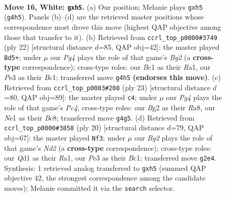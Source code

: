 \documentclass[11pt]{article}
\begin{document}
\clearpage

\begin{figure}[p]\centering
\begin{subfigure}{0.46\textwidth}\centering
\resizebox{\linewidth}{!}{%
\newchessgame
\chessboard[
  setfen={nrb2rk1/pp2npbp/3q4/2p1p2p/6P1/3PP3/PP3PBK/RNBQNR2 w - - 0 16},
  showmover=false,
  pgfstyle=straightmove, color=movearrow, markmove={g4-h5}
]}
\caption{}
\end{subfigure}\hfill
\begin{subfigure}{0.46\textwidth}\centering
\resizebox{\linewidth}{!}{%
\newchessgame
\chessboard[
  setfen={r1b1qrk1/ppp3pp/2np4/5p1n/2PP4/2PQ3N/P3PPB1/R1B1K2R w KQ - 0 12},
  showmover=false,
  pgfstyle=straightmove, color=movearrow, markmove={g2-d5}
]}
\caption{}
\end{subfigure}
\\[4pt]
\begin{subfigure}{0.46\textwidth}\centering
\resizebox{\linewidth}{!}{%
\newchessgame
\chessboard[
  setfen={r1b1k2r/ppqn1pp1/3bp2p/2p5/P2PQ3/3B1N2/1PP2PPP/R1B2RK1 b kq - 1 12},
  showmover=false,
  pgfstyle=straightmove, color=movearrow, markmove={c5-c4}
]}
\caption{}
\end{subfigure}\hfill
\begin{subfigure}{0.46\textwidth}\centering
\resizebox{\linewidth}{!}{%
\newchessgame
\chessboard[
  setfen={r1bqk2r/2ppnppp/2p5/p3b3/1P2P3/2PB4/P1QN1PPP/R1B1K2R w KQkq - 0 11},
  showmover=false,
  pgfstyle=straightmove, color=movearrow, markmove={d2-f3}
]}
\caption{}
\end{subfigure}
\caption{\textbf{Move 16, White: \texttt{gxh5}.} (a) Our position; Melanie plays \texttt{gxh5} (\texttt{g4h5}). Panels (b)--(d) are the retrieved master positions whose correspondence most drove this move (highest QAP objective among those that transfer to it). (b) Retrieved from \texttt{ccrl\_top\_p0000\#3749} (ply 22) [structural distance $d$=85, QAP obj=42]: the master played \texttt{Bd5+}; under $\mu$ our \emph{Pg4} plays the role of that game's \emph{Bg2} (a \textbf{cross-type} correspondence); cross-type roles: our \emph{B}c1 as their \emph{R}a1, our \emph{P}e3 as their \emph{B}c1; transferred move \texttt{g4h5} \textbf{(endorses this move)}. (c) Retrieved from \texttt{ccrl\_top\_p0003\#208} (ply 23) [structural distance $d$=80, QAP obj=89]: the master played \texttt{c4}; under $\mu$ our \emph{Pg4} plays the role of that game's \emph{Pc4}; cross-type roles: our \emph{B}g2 as their \emph{R}a8, our \emph{N}e1 as their \emph{B}c8; transferred move \texttt{g4g5}. (d) Retrieved from \texttt{ccrl\_top\_p0000\#3858} (ply 20) [structural distance $d$=79, QAP obj=67]: the master played \texttt{Nf3}; under $\mu$ our \emph{Bg2} plays the role of that game's \emph{Nd2} (a \textbf{cross-type} correspondence); cross-type roles: our \emph{Q}d1 as their \emph{R}a1, our \emph{P}e3 as their \emph{B}c1; transferred move \texttt{g2e4}. Synthesis: 1 retrieved analog transferred to \texttt{gxh5} (summed QAP objective 42, the strongest correspondence among the candidate moves); Melanie committed it via the \texttt{search} selector.}
\label{fig:thought-m30}
\end{figure}
\end{document}
